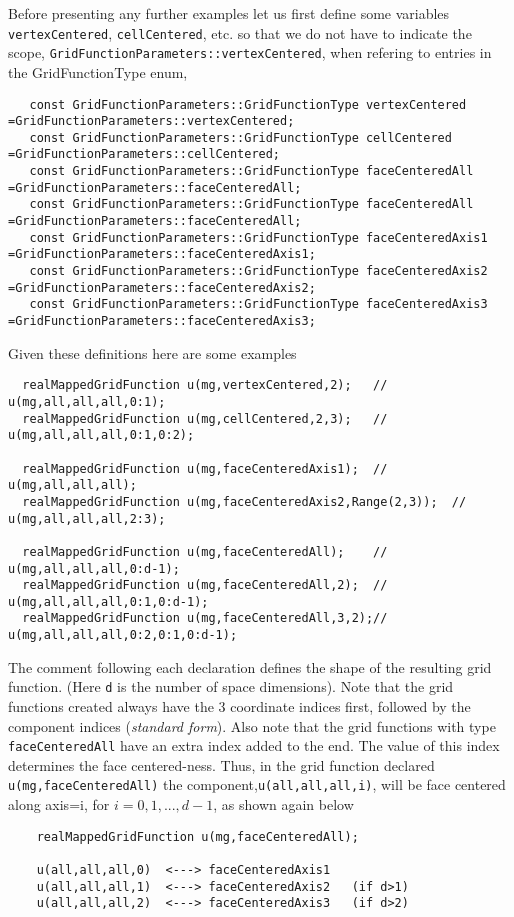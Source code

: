 Before presenting any further examples 
let us first define some variables {\tt vertexCentered}, {\tt cellCentered}, etc. so that we do not
have to indicate the scope, {\tt GridFunctionParameters::vertexCentered}, when refering to
entries in the GridFunctionType enum,
{\footnotesize
\begin{verbatim}
   const GridFunctionParameters::GridFunctionType vertexCentered    =GridFunctionParameters::vertexCentered;
   const GridFunctionParameters::GridFunctionType cellCentered      =GridFunctionParameters::cellCentered;
   const GridFunctionParameters::GridFunctionType faceCenteredAll   =GridFunctionParameters::faceCenteredAll;
   const GridFunctionParameters::GridFunctionType faceCenteredAll   =GridFunctionParameters::faceCenteredAll;
   const GridFunctionParameters::GridFunctionType faceCenteredAxis1 =GridFunctionParameters::faceCenteredAxis1;
   const GridFunctionParameters::GridFunctionType faceCenteredAxis2 =GridFunctionParameters::faceCenteredAxis2;
   const GridFunctionParameters::GridFunctionType faceCenteredAxis3 =GridFunctionParameters::faceCenteredAxis3;
\end{verbatim}
}
Given these definitions here are some examples
{\footnotesize  
\begin{verbatim} 
  realMappedGridFunction u(mg,vertexCentered,2);   // u(mg,all,all,all,0:1);
  realMappedGridFunction u(mg,cellCentered,2,3);   // u(mg,all,all,all,0:1,0:2);
			      
  realMappedGridFunction u(mg,faceCenteredAxis1);  // u(mg,all,all,all);
  realMappedGridFunction u(mg,faceCenteredAxis2,Range(2,3));  // u(mg,all,all,all,2:3);
			      
  realMappedGridFunction u(mg,faceCenteredAll);    // u(mg,all,all,all,0:d-1);
  realMappedGridFunction u(mg,faceCenteredAll,2);  // u(mg,all,all,all,0:1,0:d-1);
  realMappedGridFunction u(mg,faceCenteredAll,3,2);// u(mg,all,all,all,0:2,0:1,0:d-1);
\end{verbatim}  
}  
The comment following each declaration defines the shape of the resulting grid function.
(Here {\tt d} is the number of space dimensions).
Note that the grid functions created always have the 3 coordinate indices first, followed by the
component indices ({\sl standard form}).
Also note that the grid functions with type {\tt faceCenteredAll} have an
extra index added to the end. The value of this index determines the face centered-ness.
Thus, in the grid function declared {\tt u(mg,faceCenteredAll)} 
the component,{\tt u(all,all,all,i)}, will be face centered
along axis=i, for $i=0,1,...,d-1$, as shown again below
{\footnotesize
\begin{verbatim}
    realMappedGridFunction u(mg,faceCenteredAll);

    u(all,all,all,0)  <---> faceCenteredAxis1
    u(all,all,all,1)  <---> faceCenteredAxis2   (if d>1)
    u(all,all,all,2)  <---> faceCenteredAxis3   (if d>2)
\end{verbatim}
}


